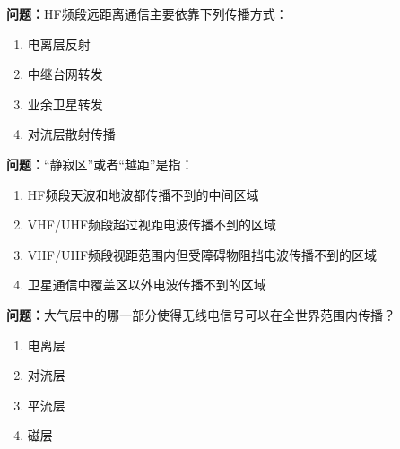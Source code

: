 \bigskip


\noindent\textbf{问题：}HF频段远距离通信主要依靠下列传播方式：
\begin{enumerate}[label=\Alph*), leftmargin=3em]
\item 电离层反射
\item 中继台网转发
\item 业余卫星转发
\item 对流层散射传播
\end{enumerate}

\bigskip


\noindent\textbf{问题：}“静寂区”或者“越距”是指：
\begin{enumerate}[label=\Alph*), leftmargin=3em]
\item HF频段天波和地波都传播不到的中间区域
\item VHF/UHF频段超过视距电波传播不到的区域
\item VHF/UHF频段视距范围内但受障碍物阻挡电波传播不到的区域
\item 卫星通信中覆盖区以外电波传播不到的区域
\end{enumerate}

\bigskip


\noindent\textbf{问题：}大气层中的哪一部分使得无线电信号可以在全世界范围内传播？
\begin{enumerate}[label=\Alph*), leftmargin=3em]
\item 电离层
\item 对流层
\item 平流层
\item 磁层
\end{enumerate}

\bigskip
